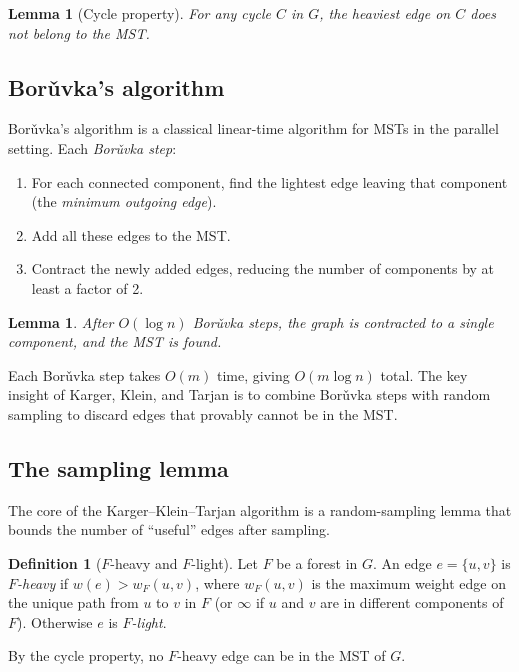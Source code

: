 \documentclass[twoside,12pt]{book}
\theoremstyle{plain}
\newtheorem{lemma}[theorem]{Lemma}
\theoremstyle{definition}
\newtheorem{definition}[theorem]{Definition}
\theoremstyle{remark}
\begin{document}
\begin{lemma}[Cycle property]
For any cycle $C$ in $G$, the heaviest edge on $C$ does not belong to the MST.
\end{lemma}

\subsection{Bor\v{u}vka's algorithm}

Bor\v{u}vka's algorithm is a classical linear-time algorithm for MSTs in the parallel setting. Each \emph{Bor\v{u}vka step}:
\begin{enumerate}[nosep]
    \item For each connected component, find the lightest edge leaving that component (the \emph{minimum outgoing edge}).
    \item Add all these edges to the MST.
    \item Contract the newly added edges, reducing the number of components by at least a factor of 2.
\end{enumerate}

\begin{lemma}
After $O(\log n)$ Bor\v{u}vka steps, the graph is contracted to a single component, and the MST is found.
\end{lemma}

Each Bor\v{u}vka step takes $O(m)$ time, giving $O(m \log n)$ total. The key insight of Karger, Klein, and Tarjan is to combine Bor\v{u}vka steps with random sampling to discard edges that provably cannot be in the MST.

\subsection{The sampling lemma}

The core of the Karger--Klein--Tarjan algorithm is a random-sampling lemma that bounds the number of ``useful'' edges after sampling.

\begin{definition}[$F$-heavy and $F$-light]
Let $F$ be a forest in $G$. An edge $e = \{u, v\}$ is \emph{$F$-heavy} if $w(e) > w_F(u, v)$, where $w_F(u, v)$ is the maximum weight edge on the unique path from $u$ to $v$ in $F$ (or $\infty$ if $u$ and $v$ are in different components of $F$). Otherwise $e$ is \emph{$F$-light}.
\end{definition}

By the cycle property, no $F$-heavy edge can be in the MST of $G$.
\end{document}
